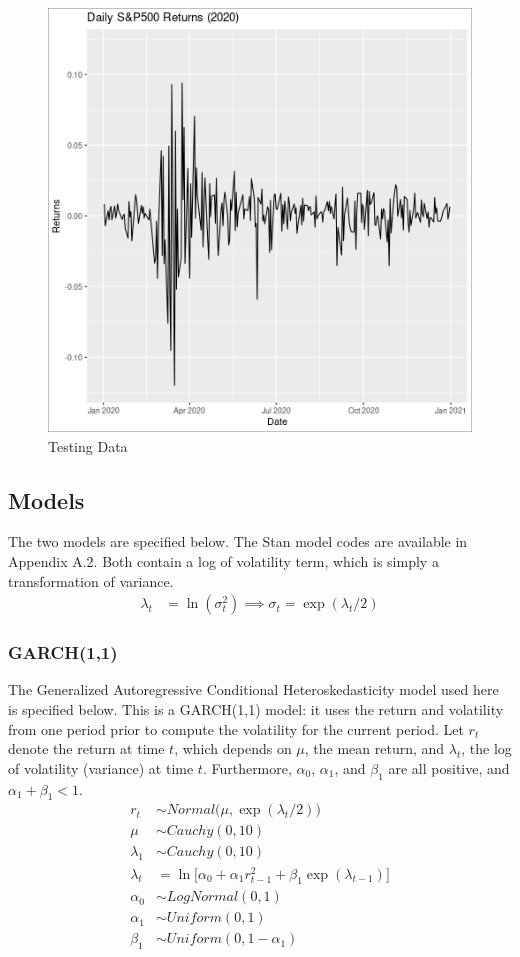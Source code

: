 \documentclass[12pt,letterpaper,reqno,fleqn]{article}
\begin{document}
\begin{figure}
\includegraphics[scale=.5]{plot20}
\caption{Testing Data}
\end{figure}

\subsection{Models}
The two models are specified below. The Stan model codes are available in Appendix A.2. Both contain a log of volatility term, which is simply a transformation of variance.
\begin{align}
\lambda_t & = \ln(\sigma^2_t)
\implies \sigma_t = \exp(\lambda_t/2) 
\end{align}

\subsubsection{GARCH(1,1)}
The Generalized Autoregressive Conditional Heteroskedasticity model used here is specified below. This is a GARCH(1,1) model: it uses the return and volatility from one period prior to compute the volatility for the current period. Let $r_t$ denote the return at time $t$, which depends on $\mu$, the mean return, and $\lambda_t$, the log of volatility (variance) at time $t$. Furthermore, $\alpha_0$, $\alpha_1$, and $\beta_1$ are all positive, and $\alpha_1 + \beta_1 < 1$.  
\begin{align}
r_t &\sim Normal\bigl(\mu, \exp(\lambda_t/2)\bigr) \\
\mu &\sim Cauchy(0, 10) \\
\lambda_1 &\sim Cauchy(0,10) \\
\lambda_t &= \ln\bigl[\alpha_0 + \alpha_1 r_{t-1}^2 + \beta_1 \exp(\lambda_{t-1})\bigr] \\
\alpha_0  &\sim LogNormal(0,1) \\
\alpha_1 &\sim Uniform(0,1) \\
\beta_1 &\sim Uniform(0, 1 - \alpha_1)
\end{align}
\end{document}

